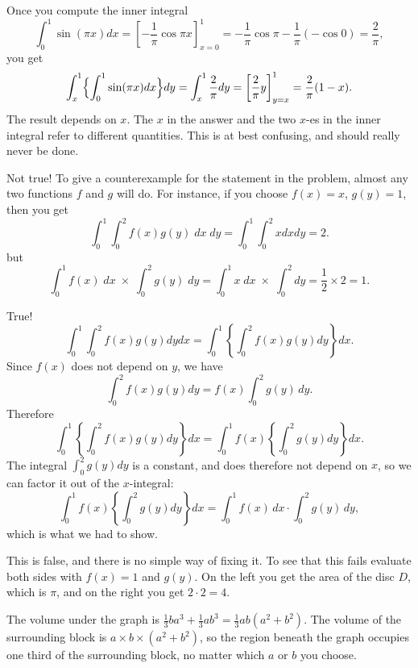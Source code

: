\item[{\bfseries(VI3.2)}]

Once you compute the inner integral
\[
\int_0^1 \sin(\pi x) dx  = \left[ -\frac1\pi\cos\pi x \right]_{x=0}^1
=-\frac1\pi\cos \pi - \frac1\pi (-\cos 0) = \frac 2\pi,
\]
you get
\[
\int_x^1 \Bigl\{\int_0^1 \sin(\pi x) dx \Bigr\}dy
=\int_x^1 \frac 2\pi dy = \left[ \frac 2\pi y \right]_{y=x}^1 = \frac 2\pi (1-x).
\]
The result depends on $x$.  The $x$ in the answer and the two $x$-es
in the inner integral refer to different quantities.  This is at best
confusing, and should really never be done.
\bigskip

\item[{\bfseries(VI3.3a)}]

Not true!
To give a counterexample for the statement in the problem, almost any
two functions $f$ and $g$ will do.  For instance, if you choose $f(x) = x$, $g(y)=1$, then you get
\[
\int_0^1 \int_0^2 f(x) g(y) \; dx\; dy= \int_0^1\int_0^2 xdx dy = 2.
\]
but
\[
\int_0^1 f(x) \; dx\; \times\;
\int_0^2 g(y)\; dy
=
\int_0^1 x \; dx\; \times\;
\int_0^2  dy
=
\frac{1}{2}\times2 = 1.
\]
\bigskip

\item[{\bfseries(VI3.3b)}]

True!
\[
  \int_0^1\int_0^2 f(x)g(y) dy dx
  =\int_0^1\left\{ \int_0^2 f(x)g(y) dy \right\}dx .
\]
Since $f(x)$ does not depend on $y$, we have
\[
\int_0^2 f(x)g(y) dy=f(x) \int_0^2 g(y)\, dy.
\]
Therefore
\[
  \int_0^1\left\{ \int_0^2 f(x)g(y) dy \right\}dx
  =\int_0^1 f(x) \left\{\int_0^2 g(y) dy \right\}dx .
\]
The integral $\int_0^2 g(y)dy$ is a constant, and does therefore not depend on $x$,
so we can factor it out of the $x$-integral:
\[
  \int_0^1 f(x) \left\{\int_0^2 g(y) dy \right\}dx
  = \int_0^1 f(x)\, dx \cdot \int_0^2 g(y)\, dy,
\]
which is what we had to show.
\bigskip

\item[{\bfseries(VI3.3c)}]

This is false, and there is no simple way of fixing it.  To see that this fails
evaluate both sides with $f(x) = 1$ and $g(y)$.  On the left you get the area of
the disc $D$, which is $\pi$, and on the right you get $2\cdot2=4$.
\bigskip

\item[{\bfseries(VI3.4)}]

The volume under the graph is
$\frac13 ba^3 + \frac13 ab^3 = \frac 13 ab(a^2+b^2)$.
The volume of the surrounding block is $a\times b\times (a^2+b^2)$, so
the region beneath the graph occupies one third of the surrounding
block, no matter which $a$ or $b$ you choose.
\bigskip


